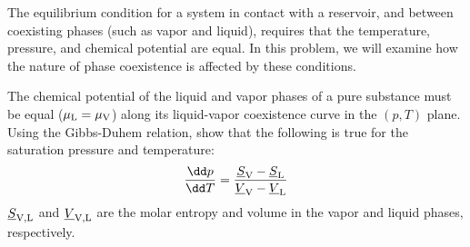 The equilibrium condition for a system in contact with a reservoir,
and between coexisting phases (such as vapor and liquid),
requires that the temperature, pressure, and chemical potential are equal.
In this problem, we will examine how the nature of phase coexistence 
is affected by these conditions.

\smallskip \subp
The chemical potential of the liquid and vapor phases of a pure substance must be equal
($\mu_{\rm L} = \mu_{\rm V}$)
along its liquid-vapor coexistence curve in the $(p,T)$ plane. 
Using the Gibbs-Duhem relation, show that the following is true
for the saturation pressure and temperature:
\[ \frac{\dd p}{\dd T} = 
   \frac{\underline{S}_{\rm V} - \underline{S}_{\rm L}}
        {\underline{V}_{\rm V} - \underline{V}_{\rm L}} \]
$\underline{S}_{\rm V, L}$ and $\underline{V}_{\rm V, L}$ are the 
molar entropy and volume in the vapor and liquid phases, respectively.




